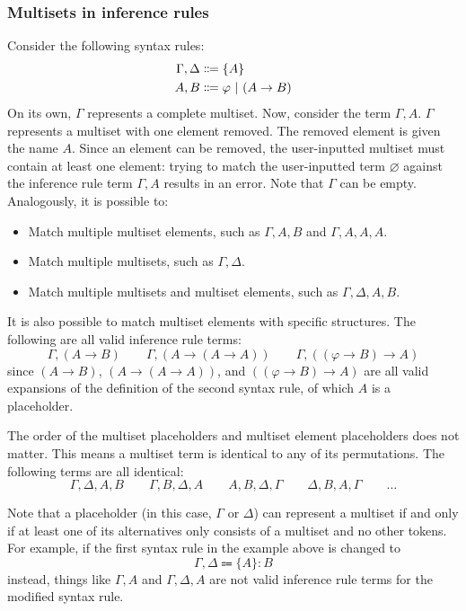 \subsubsection{Multisets in inference rules}
\label{inference:multisets}
Consider the following syntax rules:
\begin{align*}
    \Gamma, \Delta &\Coloneqq \{ A \} \\
    A, B &\Coloneqq \varphi \ |\  (A \to B)
\end{align*}
On its own, $\Gamma$ represents a complete multiset. Now, consider the term $\Gamma, A$. $\Gamma$ represents a multiset with one element removed. The removed element is given the name $A$. Since an element can be removed, the user-inputted multiset must contain at least one element: trying to match the user-inputted term $\varnothing$ against the inference rule term $\Gamma, A$ results in an error. Note that $\Gamma$ can be empty. Analogously, it is possible to:
\begin{itemize}
    \item Match multiple multiset elements, such as $\Gamma, A, B$ and $\Gamma, A, A, A$.
    \item Match multiple multisets, such as $\Gamma, \Delta$.
    \item Match multiple multisets and multiset elements, such as $\Gamma, \Delta, A, B$.
\end{itemize}

It is also possible to match multiset elements with specific structures. The following are all valid inference rule terms:
\[
    \Gamma, (A \to B) \qquad \Gamma, (A \to (A \to A)) \qquad \Gamma, ((\varphi \to B) \to A)
\]
since $(A \to B)$, $(A \to (A \to A))$, and $((\varphi \to B) \to A)$ are all valid expansions of the definition of the second syntax rule, of which $A$ is a placeholder.

The order of the multiset placeholders and multiset element placeholders does not matter. This means a multiset term is identical to any of its permutations. The following terms are all identical:
\[
    \Gamma, \Delta, A, B \qquad \Gamma, B, \Delta, A \qquad A, B, \Delta, \Gamma \qquad \Delta, B, A, \Gamma \qquad \ldots
\]

Note that a placeholder (in this case, $\Gamma$ or $\Delta$) can represent a multiset if and only if at least one of its alternatives only consists of a multiset and no other tokens. For example, if the first syntax rule in the example above is changed to
\[
    \Gamma, \Delta \Coloneqq \{ A \}: B
\]
instead, things like $\Gamma, A$ and $\Gamma, \Delta, A$ are not valid inference rule terms for the modified syntax rule.
